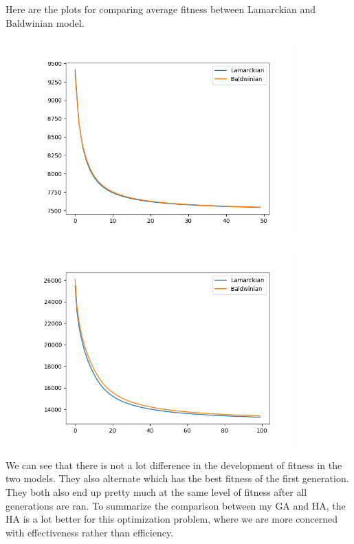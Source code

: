 \documentclass[a4paper, norsk, 12pt]{article}
\begin{document}
Here are the plots for comparing average fitness between Lamarckian and Baldwinian model.\newpage 
	\begin{figure}[hbt!]
	\centering
	\includegraphics[width=0.9\textwidth]{hybrid_10.png}
	\end{figure}
	\begin{figure}[hbt!]
	\centering
	\includegraphics[width=0.9\textwidth]{hybrid_24.png}
	\end{figure}
\newpage

We can see that there is not a lot difference in the development of fitness in the two models. They also alternate which has the best fitness of the first generation. They both also end up pretty much at the same level of fitness after all generations are ran. To summarize the comparison between my GA and HA, the HA is a lot better for this optimization problem, where we are more concerned with effectiveness rather than efficiency. 
\end{document}
